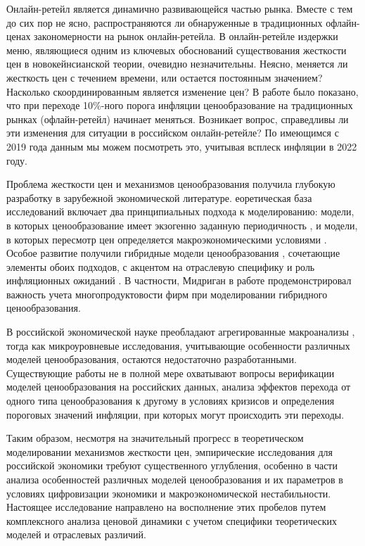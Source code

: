 Онлайн-ретейл является динамично развивающейся частью рынка. Вместе с тем до сих пор не ясно, распространяются ли обнаруженные в традиционных офлайн-ценах закономерности на рынок онлайн-ретейла. В онлайн-ретейле издержки меню, являющиеся одним из ключевых обоснований существования жесткости цен в новокейнсианской теории, очевидно незначительны. Неясно, меняется ли жесткость цен с течением времени, или остается постоянным значением? Насколько скоординированным является изменение цен? В работе \cite{gagnon2009} было показано, что при переходе 10\%-ного порога инфляции ценообразование на традиционных рынках (офлайн-ретейл) начинает меняться. Возникает вопрос, справедливы ли эти изменения для ситуации в российском онлайн-ретейле? По имеющимся с 2019 года данным мы можем посмотреть это, учитывая всплеск инфляции в 2022 году.

{\progress} Проблема жесткости цен и механизмов ценообразования получила глубокую разработку в зарубежной экономической литературе. еоретическая база исследований включает два принципиальных подхода к моделированию: модели, в которых ценообразование имеет экзогенно заданную периодичность \cite{Taylor1980,Calvo1983}, и модели, в которых пересмотр цен определяется макроэкономическими условиями \cite{caplin1987,golosov2007}. Особое развитие получили гибридные модели ценообразования \cite{Nakamura2008}, сочетающие элементы обоих подходов, с акцентом на отраслевую специфику и роль инфляционных ожиданий \cite{alvarez2014}. В частности, Мидриган в работе \cite{Midrigan2011} продемонстрировал важность учета многопродуктовости фирм при моделировании гибридного ценообразования.

В российской экономической науке преобладают агрегированные макроанализы \cite{veduta2015, gureev2018}, тогда как микроуровневые исследования, учитывающие особенности различных моделей ценообразования, остаются недостаточно разработанными. Существующие работы не в полной мере охватывают вопросы верификации моделей ценообразования на российских данных, анализа эффектов перехода от одного типа ценообразования к другому в условиях кризисов и определения пороговых значений инфляции, при которых могут происходить эти переходы.

Таким образом, несмотря на значительный прогресс в теоретическом моделировании механизмов жесткости цен, эмпирические исследования для российской экономики требуют существенного углубления, особенно в части анализа особенностей различных моделей ценообразования и их параметров в условиях цифровизации экономики и макроэкономической нестабильности. Настоящее исследование направлено на восполнение этих пробелов путем комплексного анализа ценовой динамики с учетом специфики теоретических моделей и отраслевых различий.

